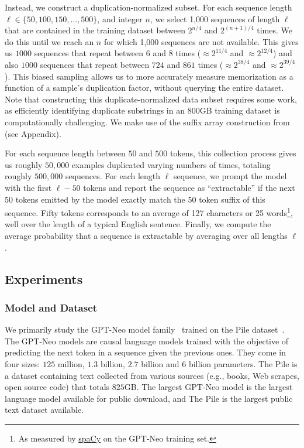 Instead, we construct a duplication-normalized subset.
%
For each sequence length $\ell \in \{50,100,150,\dots,500\}$,
and integer $n$,
we select 1,000 sequences of length $\ell$ that are contained in the training dataset between $2^{n/4}$ and $2^{(n+1)/4}$ times.
We do this until we reach an $n$ for which 1,000 sequences are not available.
%
This gives us $1000$ sequences that repeat between $6$ and $8$ times ($\approx 2^{11/4}$ and $\approx 2^{12/4}$) and also $1000$ sequences that repeat between $724$ and $861$ times ($\approx 2^{38/4}$ and $\approx 2^{39/4}$).
%
This biased sampling allows us to more accurately measure memorization as a function of a sample's duplication factor, without querying the entire dataset.
%
Note that constructing this duplicate-normalized data subset requires some work,
as efficiently identifying duplicate substrings in an $800$GB training dataset is
computationally challenging.
%
We make use of the suffix array construction from \citet{lee2021deduplicating} (see Appendix).

For each sequence length between $50$ and $500$ tokens, this collection process gives us roughly $50,000$ examples duplicated varying numbers
of times,
totaling roughly $500{,}000$ sequences.
%
For each length $\ell$ sequence, we prompt the model with the first $\ell-50$ tokens and report the sequence
as ``extractable'' if the next $50$ tokens emitted by the model exactly match the $50$ token suffix of this sequence.
Fifty tokens corresponds to an average of 127 characters or 25 words\footnote{As measured by \href{https://spacy.io/}{spaCy} on the GPT-Neo training set.}, well over the length of a typical English sentence.
%
Finally, we compute the average probability that a sequence is extractable by averaging over all lengths $\ell$.


\subsection{Experiments}

\subsubsection{Model and Dataset}
We primarily study the GPT-Neo model family~\citep{gpt-neo,gpt-j} trained on the Pile dataset~\citep{gao2020pile}.
The GPT-Neo models are causal language models 
trained with the objective of predicting the next token in a sequence given the previous ones.
They come in four sizes: $125$ million, $1.3$ billion, $2.7$ billion and $6$ billion parameters. 
The Pile is a dataset containing text collected from various sources (e.g., books, Web scrapes, open source code) that totals $825$GB.
%
The largest GPT-Neo model is the largest language model available for public download, and The Pile is the largest public text dataset available.


